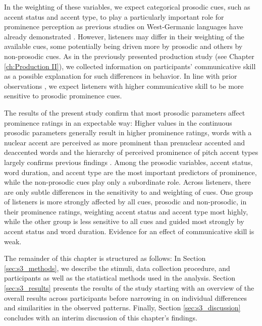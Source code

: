 In the weighting of these variables, we expect categorical prosodic cues, such as accent status and accent type, to play a particularly important role for prominence perception as previous studies on West-Germanic languages have already demonstrated \citep[e.g.,][]{baumannWhatMakesWord2018, wagnerExploitingSpeechgestureLink2019, bishopPhonologyPhoneticsSignalextrinsic2020}. However, listeners may differ in their weighting of the available cues, some potentially being driven more by prosodic and others by non-prosodic cues. As in the previously presented production study (see Chapter \ref{ch:Production II}), we collected information on participants' communicative skill as a possible explanation for such differences in behavior. In line with prior observations \citep[e.g.,][]{bishopPhonologyPhoneticsSignalextrinsic2020, orricoInfluenceEmpathyAutisticlike2023}, we expect listeners with higher communicative skill to be more sensitive to prosodic prominence cues. 

The results of the present study confirm that most prosodic parameters affect prominence ratings in an expectable way: Higher values in the continuous prosodic parameters generally result in higher prominence ratings, words with a nuclear accent are perceived as more prominent than prenuclear accented and deaccented words and the hierarchy of perceived prominence of pitch accent types largely confirms previous findings \citep[e.g.,][]{baumannPerceptualProminencePitch2015}. Among the prosodic variables, accent status, word duration, and accent type are the most important predictors of prominence, while the non-prosodic cues play only a subordinate role. Across listeners, there are only subtle differences in the sensitivity to and weighting of cues. One group of listeners is more strongly affected by all cues, prosodic and non-prosodic, in their prominence ratings, weighting accent status and accent type most highly, while the other group is less sensitive to all cues and guided most strongly by accent status and word duration. Evidence for an effect of communicative skill is weak.

The remainder of this chapter is structured as follows: In Section \ref{sec:s3_methods}, we describe the stimuli, data collection procedure, and participants as well as the statistical methods used in the analysis. Section \ref{sec:s3_results} presents the results of the study starting with an overview of the overall results across participants before narrowing in on individual differences and similarities in the observed patterns. Finally, Section \ref{sec:s3_discussion} concludes with an interim discussion of this chapter's findings.

